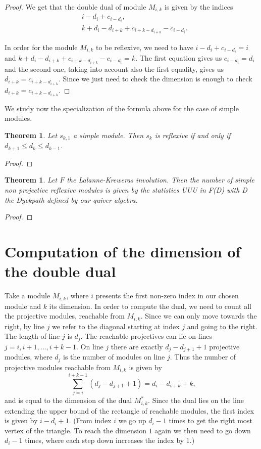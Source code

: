 \documentclass[12pt, a4paper]{article}
\numberwithin{equation}{section}
\theoremstyle{definition}
\theoremstyle{plain}
\newtheorem{theorem}[definition]{Theorem}
\theoremstyle{remark}
\begin{document}
\begin{proof}
We get that the double dual of module $M_{i,k}$ is given by the indices
\begin{align*}
    &i - d_i + c_{i - d_i}, \\
    &k + d_i - d_{i+k} + c_{i+k-{d_{i+k}}} - c_{i-d_i}.
\end{align*}

In order for the module $M_{i,k}$ to be reflexive, we need to have $i - d_i + c_{i - d_i} = i$ and $k + d_i - d_{i+k} + c_{i+k-{d_{i+k}}} - c_{i-d_i} = k$.
The first equation gives us $c_{i - d_i} = d_i$ and the second one, taking into account also the first equality, gives us $d_{i+k} = c_{i+k-{d_{i+k}}}$.
Since we just need to check the dimension is enough to check $d_{i+k}=c_{i+k-d_{i+k}}$.
\end{proof}
We study now the specialization of the formula above for the case of simple modules.
\begin{theorem}
Let $s_{k,1}$ a simple module. Then $s_k$ is reflexive
if and only if $d_{k+1}\leq d_k \leq d_{k-1}$.
\end{theorem}
\begin{proof}
	
\end{proof}
\begin{theorem}
	Let $F$ the Lalanne-Kreweras involution. 
	Then the number of simple non projective reflexive modules is given by the statistics UUU in F(D) with D the Dyckpath defined by our quiver algebra.
\end{theorem}
\begin{proof}

\end{proof}
\section{Computation of the dimension of the double dual}
Take a module $M_{i,k}$, where $i$ presents the first non-zero index in our chosen module and $k$ its dimension. 
In order to compute the dual, we need to count all the projective modules, reachable from $M_{i,k}$. 
Since we can only move towards the right, by line $j$ we refer to the diagonal starting at index $j$ and going to the right. The length of line $j$ is $d_j$.
The reachable projectives can lie on lines $j = i, i+1, \dots, i+k-1$.
On line $j$ there are exactly $d_j - d_{j+1} + 1$ projective modules, where $d_j$ is the number of modules on line $j$.
Thus the number of projective modules reachable from $M_{i,k}$ is given by
\begin{equation}
\label{eq:reachable}
\sum_{j=i}^{i+k-1} (d_j - d_{j+1} + 1) = d_i - d_{i+k} + k,
\end{equation}
and is equal to the dimension of the dual $M^*_{i,k}$.
Since the dual lies on the line extending the upper bound of the rectangle of reachable modules, the first index is given by $i - d_i + 1$.
(From index $i$ we go up $d_i - 1$ times to get the right most vertex of the triangle. To reach the dimension $1$ again we then need to go down $d_i - 1$ times, where each step down increases the index by $1$.)
\end{document}
